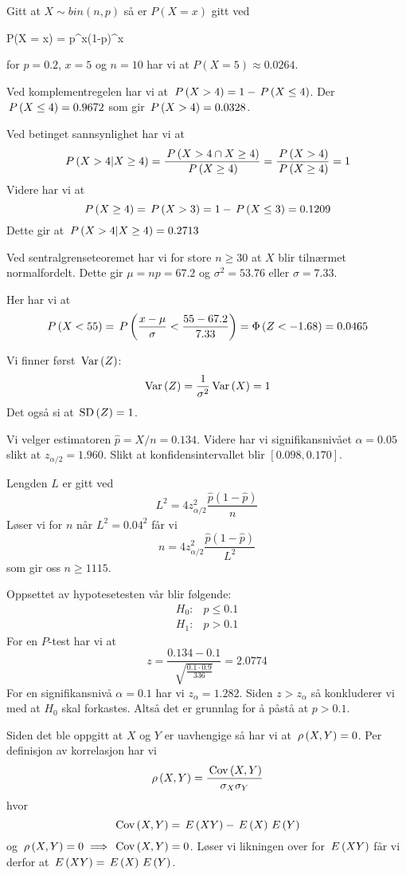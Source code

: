 \oppgave
\deloppgave
Gitt at $X \sim bin(n, p)$ så er $P(X = x)$ gitt ved
\begin{likning}
	P(X = x) = p^x(1-p)^x
\end{likning}
for $p = 0.2$, $x = 5$ og $n = 10$ har vi at $P(X = 5) \approx 0.0264$.

\deloppgave
Ved komplementregelen har vi at $\,P\left(X > 4\right) = 1 - \,P\left(X \leq 4\right)$. Der $\,P\left(X \leq 4\right) = 0.9672$ som gir $\,P\left(X > 4\right) = 0.0328$.

\deloppgave
Ved betinget sannsynlighet har vi at
$$
\,P\left(X > 4 | X \geq 4\right) = \frac{\,P\left(X > 4 \cap X \geq 4\right)}{\,P\left(X \geq 4\right)} = \frac{\,P\left(X > 4\right)}{\,P\left(X \geq 4\right)} = 1
$$
Videre har vi at 
$$
\,P\left(X \geq 4\right) = \,P\left(X > 3\right) = 1 - \,P\left(X \leq 3\right) = 0.1209
$$
Dette gir at $\,P\left(X > 4 | X \geq 4\right) = 0.2713$

\deloppgave
Ved sentralgrenseteoremet har vi for store $n \geq 30$ at $X$ blir tilnærmet normalfordelt. Dette gir $\mu = np = 67.2$ og $\sigma^2 = 53.76$ eller $\sigma = 7.33$.

\deloppgave
Her har vi at
$$
\,P\left(X < 55\right) = \,P\left(\frac{x - \mu}{\sigma} < \frac{55-67.2}{7.33}\right) = \Phi\left(Z < -1.68\right) = 0.0465
$$

\deloppgave
Vi finner først $\, \mathrm{Var}\left(Z\right)$:
$$
\, \mathrm{Var}\left(Z\right) = \frac{1}{\sigma^2}\, \mathrm{Var}\left(X\right) = 1
$$
Det også si at $\,\mathrm{SD}\left(Z\right) = 1$.

\deloppgave
Vi velger estimatoren $\hat{p} = X/n = 0.134$. Videre har vi signifikansnivået $\alpha = 0.05$ slikt at $z_{\alpha/2} = 1.960$. Slikt at konfidensintervallet blir $\left[0.098, 0.170\right]$.

\deloppgave
Lengden $L$ er gitt ved
$$
L^2 = 4z_{\alpha/2}^2\frac{\hat{p}(1-\hat{p})}{n}
$$
Løser vi for $n$ når $L^2 = 0.04^2$ får vi
$$
n = 4z_{\alpha/2}^2\frac{\hat{p}(1-\hat{p})}{L^2}
$$
som gir oss $n \geq 1115$.

\deloppgave
Oppsettet av hypotesetesten vår blir følgende:
\begin{align*}
	H_0\colon & p \leq 0.1\\
	H_1\colon & p > 0.1
\end{align*}
For en $P$-test har vi at
$$
z = \frac{0.134 - 0.1}{\sqrt{\frac{0.1\cdot0.9}{336}}} = 2.0774
$$
For en signifikansnivå $\alpha = 0.1$ har vi $z_\alpha = 1.282$. Siden $z > z_\alpha$ så konkluderer vi med at $H_0$ skal forkastes. Altså det er grunnlag for å påstå at $p > 0.1$.

\oppgave
Siden det ble oppgitt at $X$ og $Y$ er uavhengige så har vi at $\,\rho\left(X, Y\right) = 0$. Per definisjon av korrelasjon har vi
$$
\,\rho\left(X, Y\right) = \frac{\,\mathrm{Cov}\left(X, Y\right)}{\sigma_X\sigma_Y}
$$
hvor
$$
\,\mathrm{Cov}\left(X, Y\right) = \,E\left(XY\right) - \,E\left(X\right)\,E\left(Y\right)
$$
og $\,\rho\left(X, Y\right) = 0 \implies \,\mathrm{Cov}\left(X, Y\right) = 0$. Løser vi likningen over for $\,E\left(XY\right)$ får vi derfor at $\,E\left(XY\right) = \,E\left(X\right)\,E\left(Y\right)$.

